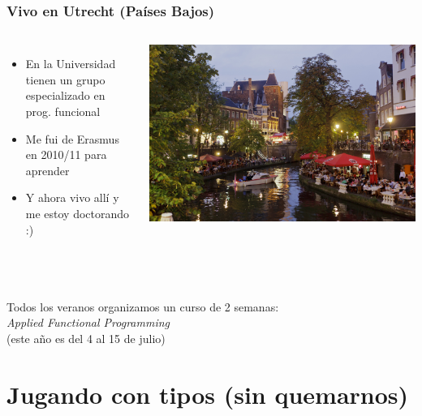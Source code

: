 \documentclass{beamer}
\begin{document}
\begin{frame}[fragile]
\frametitle{Vivo en Utrecht (Países Bajos)}
\begin{columns}
\begin{itemize}
\item En la Universidad tienen un grupo especializado en prog. funcional
\item Me fui de Erasmus en 2010/11 para aprender
\item Y ahora vivo allí y me estoy doctorando :)
\end{itemize}
\includegraphics[scale=0.2]{utrecht.jpg}
\end{columns}
\

Todos los veranos organizamos un curso de 2 semanas: \\
\emph{\Large Applied Functional Programming} \\
(este año es del 4 al 15 de julio)
\end{frame}

\section{Jugando con tipos (sin quemarnos)}
\end{document}
